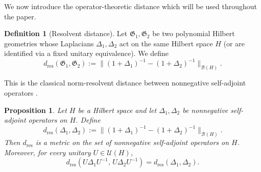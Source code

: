 \documentclass{amsart}
\numberwithin{equation}{section}
\newtheorem{proposition}[theorem]{Proposition}
\theoremstyle{definition}
\newtheorem{definition}[theorem]{Definition}
\theoremstyle{remark}
\begin{document}
We now introduce the operator-theoretic distance which will be used throughout the paper.

\begin{definition}[Resolvent distance]
Let $\mathfrak G_1,\mathfrak G_2$ be two polynomial Hilbert geometries whose Laplacians
$\Delta_1,\Delta_2$ act on the same Hilbert space $H$
(or are identified via a fixed unitary equivalence).
We define
\begin{equation}\label{eq:resolvent-distance}
d_{\mathrm{res}}(\mathfrak G_1,\mathfrak G_2)
:=
\big\|(1+\Delta_1)^{-1}-(1+\Delta_2)^{-1}\big\|_{\mathcal B(H)}.
\end{equation}
\end{definition}

This is the classical norm-resolvent distance between nonnegative self-adjoint operators
\cite{Kato,Ouhabaz}.

\begin{proposition}\label{prop:resolvent-metric}
Let $H$ be a Hilbert space and let $\Delta_1,\Delta_2$ be nonnegative self-adjoint operators on $H$.
Define
\[
d_{\mathrm{res}}(\Delta_1,\Delta_2)
:=\big\|(1+\Delta_1)^{-1}-(1+\Delta_2)^{-1}\big\|_{\mathcal B(H)}.
\]
Then $d_{\mathrm{res}}$ is a metric on the set of nonnegative self-adjoint operators on $H$.
Moreover, for every unitary $U\in\mathcal U(H)$,
\[
d_{\mathrm{res}}(U\Delta_1U^{-1},\,U\Delta_2U^{-1})=d_{\mathrm{res}}(\Delta_1,\Delta_2).
\]
\end{proposition}
\end{document}
